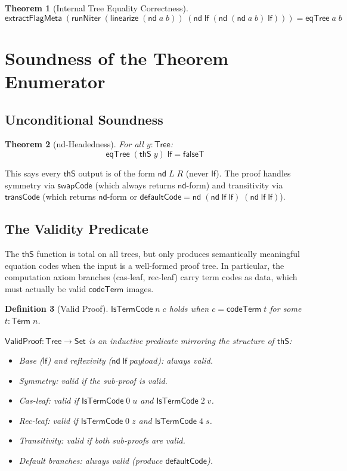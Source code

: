\documentclass[11pt]{article}
\newtheorem{theorem}{Theorem}
\newtheorem{definition}[theorem]{Definition}
\newcommand{\lf}{\mathsf{lf}}
\newcommand{\nd}{\mathsf{nd}}
\newcommand{\codeTerm}{\mathsf{codeTerm}}
\newcommand{\thS}{\mathsf{thS}}
\newcommand{\eqTree}{\mathsf{eqTree}}
\newcommand{\transCode}{\mathsf{transCode}}
\newcommand{\swapCode}{\mathsf{swapCode}}
\newcommand{\Tree}{\mathsf{Tree}}
\newcommand{\Term}{\mathsf{Term}}
\newcommand{\ValidProof}{\mathsf{ValidProof}}
\newcommand{\IsTermCode}{\mathsf{IsTermCode}}
\begin{document}
\begin{theorem}[Internal Tree Equality Correctness]
\[
  \mathsf{extractFlagMeta}\;(\mathsf{runNiter}\;(\mathsf{linearize}\;(\nd\;a\;b))\;(\nd\;\lf\;(\nd\;(\nd\;a\;b)\;\lf))) = \eqTree\;a\;b
\]
\end{theorem}

\section{Soundness of the Theorem Enumerator}

\subsection{Unconditional Soundness}

\begin{theorem}[nd-Headedness]\label{thm:nd-headed}
For all $y : \Tree$:
\[
  \eqTree\;(\thS\;y)\;\lf = \mathsf{falseT}
\]
\end{theorem}

\noindent This says every $\thS$ output is of the form $\nd\;L\;R$ (never $\lf$).
The proof handles symmetry via $\swapCode$ (which always returns $\nd$-form)
and transitivity via $\transCode$ (which returns $\nd$-form or
$\mathsf{defaultCode} = \nd\;(\nd\;\lf\;\lf)\;(\nd\;\lf\;\lf)$).

\subsection{The Validity Predicate}

The $\thS$ function is total on all trees, but only produces semantically
meaningful equation codes when the input is a well-formed proof tree.
In particular, the computation axiom branches (cas-leaf, rec-leaf) carry
term codes as data, which must actually be valid $\codeTerm$ images.

\begin{definition}[Valid Proof]
$\IsTermCode\;n\;c$ holds when $c = \codeTerm\;t$ for some $t : \Term\;n$.

$\ValidProof : \Tree \to \mathsf{Set}$ is an inductive predicate mirroring
the structure of $\thS$:
\begin{itemize}
  \item Base ($\lf$) and reflexivity ($\nd\;\lf\;\mathit{payload}$): always valid.
  \item Symmetry: valid if the sub-proof is valid.
  \item Cas-leaf: valid if $\IsTermCode\;0\;u$ and $\IsTermCode\;2\;v$.
  \item Rec-leaf: valid if $\IsTermCode\;0\;z$ and $\IsTermCode\;4\;s$.
  \item Transitivity: valid if both sub-proofs are valid.
  \item Default branches: always valid (produce $\mathsf{defaultCode}$).
\end{itemize}
\end{definition}
\end{document}
